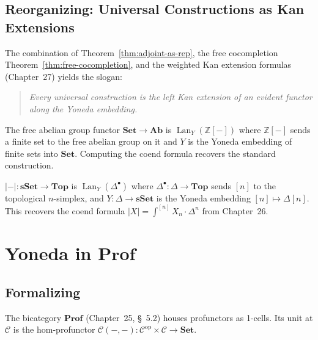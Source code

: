 \subsection{Reorganizing: Universal Constructions as Kan Extensions}

The combination of Theorem~\ref{thm:adjoint-as-rep}, the free cocompletion
Theorem~\ref{thm:free-cocompletion}, and the weighted Kan extension formulas
(Chapter~27) yields the slogan:
\begin{quote}
\emph{Every universal construction is the left Kan extension of an evident
functor along the Yoneda embedding.}
\end{quote}

\begin{example_thm}
The free abelian group functor $\mathbf{Set} \to \mathbf{Ab}$ is
$\operatorname{Lan}_Y (\mathbb{Z}[-])$ where $\mathbb{Z}[-]$ sends a finite
set to the free abelian group on it and $Y$ is the Yoneda embedding of
finite sets into $\mathbf{Set}$. Computing the coend formula recovers the
standard construction.
\end{example_thm}

\begin{example_thm}
$|-| : \mathbf{sSet} \to \mathbf{Top}$ is $\operatorname{Lan}_Y(\Delta^\bullet)$
where $\Delta^\bullet : \Delta \to \mathbf{Top}$ sends $[n]$ to the topological
$n$-simplex, and $Y : \Delta \to \mathbf{sSet}$ is the Yoneda embedding
$[n] \mapsto \Delta[n]$. This recovers the coend formula $|X| = \int^{[n]}
X_n \cdot \Delta^n$ from Chapter~26.
\end{example_thm}


\section{Yoneda in $\mathbf{Prof}$}
\label{sec:yoneda-prof}

\subsection{Formalizing}

The bicategory $\mathbf{Prof}$ (Chapter~25, \S~5.2) houses profunctors as
1-cells. Its unit at $\mathcal{C}$ is the hom-profunctor $\mathcal{C}(-, -) :
\mathcal{C}^{\mathrm{op}} \times \mathcal{C} \to \mathbf{Set}$.

